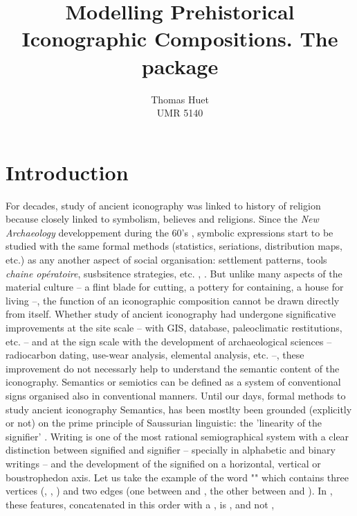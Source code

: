 \documentclass[article]{jss}
\author{Thomas Huet\\UMR 5140}
\title{Modelling Prehistorical Iconographic Compositions. The \proglang{R} package \pkg{decorr}}
\begin{document}


\section[Introduction]{Introduction} \label{sec:intro}

For decades, study of ancient iconography was linked to history of religion because closely linked to symbolism, believes and religions. Since the \textit{New Archaeology} developpement during the 60's \citep{Clarke14}, symbolic expressions start to be studied with the same formal methods (statistics, seriations, distribution maps, etc.) as any another aspect of social organisation: settlement patterns, tools \emph{chaine opératoire}, susbsitence strategies, etc. \citep{Renfrew91}, \citep{LeroiGourhan92}. But unlike many aspects of the material culture -- a flint blade for cutting, a pottery for containing, a house for living --, the function of an iconographic composition cannot be drawn directly from itself. Whether study of ancient iconography had  undergone significative improvements at the site scale -- with GIS, database, paleoclimatic restitutions, etc. -- and at the sign scale with the development of archaeological sciences -- radiocarbon dating, use-wear analysis, elemental analysis, etc. --, these improvement do not necessarly help to understand the semantic content of the iconography.
Semantics or semiotics can be defined as a system of conventional signs organised also in conventional manners.  
Until our days, formal methods to study ancient iconography Semantics, has been mostlty been grounded (explicitly or not) on the prime principle of Saussurian linguistic: the 'linearity of the signifier' \citep{Saussure89}. Writing is one of the most rational semiographical system with a clear distinction between signified and signifier -- specially in alphabetic and binary writings -- and the development of the signified on a horizontal, vertical or boustrophedon axis. 
Let us take the example of the word "" which contains three vertices (, , ) and two edges (one between  and , the other between  and ). In , these features, concatenated in this order with a , is , and not , 
\end{document}
